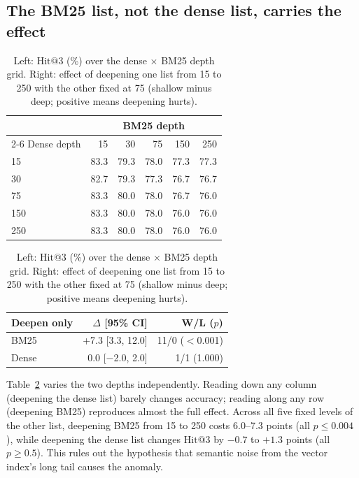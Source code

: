 \documentclass[11pt, letterpaper]{article}
\makeatletter
\newcommand{\hit}{\mathrm{Hit@3}}
\makeatother
\begin{document}
\subsection{The BM25 list, not the dense list, carries the effect}\label{sec:grid}
\begin{table}[htbp]
\centering\small
\caption{Left: $\hit$ (\%) over the dense $\times$ BM25 depth grid. Right: effect of deepening one list from 15 to 250
with the other fixed at 75 (shallow minus deep; positive means deepening hurts).}
\label{tab:grid}
\begin{tabular}{@{}lrrrrr@{}}
\toprule
 & \multicolumn{5}{c}{BM25 depth} \\
\cmidrule(l){2-6}
Dense depth & 15 & 30 & 75 & 150 & 250 \\
\midrule
15  & 83.3 & 79.3 & 78.0 & 77.3 & 77.3 \\
30  & 82.7 & 79.3 & 77.3 & 76.7 & 76.7 \\
75  & 83.3 & 80.0 & 78.0 & 76.7 & 76.0 \\
150 & 83.3 & 80.0 & 78.0 & 76.0 & 76.0 \\
250 & 83.3 & 80.0 & 78.0 & 76.0 & 76.0 \\
\bottomrule
\end{tabular}
\hspace{1.2em}
\begin{tabular}{@{}lrr@{}}
\toprule
Deepen only & $\Delta$ [95\% CI] & W/L ($p$) \\
\midrule
BM25  & +7.3 [3.3, 12.0] & 11/0 ($<$0.001) \\
Dense & \phantom{+}0.0 [$-$2.0, 2.0] & 1/1 (1.000) \\
\bottomrule
\end{tabular}
\end{table}

Table~\ref{tab:grid} varies the two depths independently. Reading down any column (deepening the dense list) barely
changes accuracy; reading along any row (deepening BM25) reproduces almost the full effect. Across all five fixed
levels of the other list, deepening BM25 from 15 to 250 costs 6.0--7.3 points (all $p\le0.004$), while deepening the
dense list changes $\hit$ by $-0.7$ to $+1.3$ points (all $p\ge0.5$). This rules out the hypothesis that semantic
noise from the vector index's long tail causes the anomaly.
\end{document}
